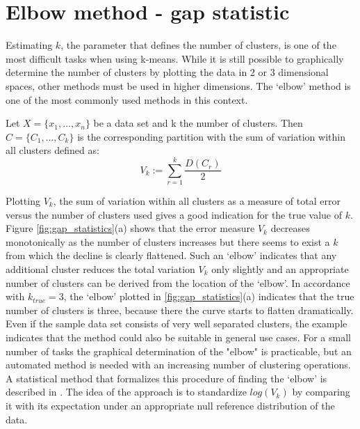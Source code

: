 \clearpage %
\section{Elbow method - gap statistic}
Estimating $k$, the parameter that defines the number of clusters, is one of the most difficult  tasks when using k-means. While it is still possible to graphically determine the number of clusters by plotting the data in 2 or 3 dimensional spaces, other methods must be used in higher dimensions. The `elbow' method is one of the most commonly used methods in this context. 

\begin{definition}
Let $X = \{x_1, ..., x_n\}$ be a data set and k the number of clusters. Then $C=\{C_1, ..., C_k\}$ is the corresponding partition with the sum of variation within all clusters defined as: 
	\begin{equation*}
		V_k := \sum_{r=1}^k \frac{D(C_r)}{2}
	\end{equation*}
\end{definition}

 Plotting $V_k$, the sum of variation within all clusters as a measure of total error versus the number of clusters used gives a good indication for the true value of $k$. Figure \ref{fig:gap_statistics}(a) shows that the error measure $V_k$ decreases monotonically as the number of clusters increases but there seems to exist a $k$ from which the decline is clearly flattened. Such an `elbow' indicates that any additional cluster reduces the total variation $V_k$ only slightly and an appropriate number of clusters can be derived from the location of the `elbow'. In accordance with $k_{true}=3$, the `elbow' plotted in \ref{fig:gap_statistics}(a) indicates that the true number of clusters is three, because there the curve starts to flatten dramatically. Even if the sample data set consists of very well separated clusters, the example indicates that the method could also be suitable in general use cases. For a small number of tasks the graphical determination of the "elbow" is practicable, but an automated method is needed with an increasing number of clustering operations. A statistical method that formalizes this procedure of finding the `elbow' is described in \cite{tibshirani2001estimating}. The idea of the approach is to standardize $log(V_k)$ by comparing it with its expectation under an appropriate null reference distribution of the data. 
 
